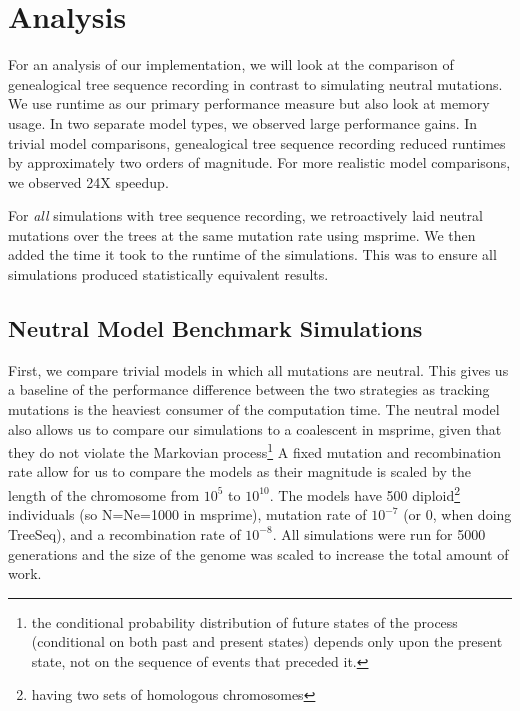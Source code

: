 \documentclass{article}
\begin{document}
\section{Analysis}

For an analysis of our implementation, we will look at the comparison of genealogical tree sequence recording in contrast to simulating neutral mutations. 
We use runtime as our primary performance measure but also look at memory usage.
In two separate model types, we observed large performance gains. 
In trivial model comparisons, genealogical tree sequence recording reduced runtimes by approximately two orders of magnitude. 
For more realistic model comparisons, we observed 24X speedup.

For \textit{all} simulations with tree sequence recording, we retroactively laid neutral mutations over the trees at the same mutation rate using msprime. 
We then added the time it took to the runtime of the simulations.
This was to ensure all simulations produced statistically equivalent results.


\subsection{Neutral Model Benchmark Simulations}

First, we compare trivial models in which all mutations are neutral.
This gives us a baseline of the performance difference between the two strategies
as tracking mutations is the heaviest consumer of the computation time.
The neutral model also allows us to compare our simulations to a coalescent in msprime,
given that they do not violate the 
Markovian process\footnote{the conditional probability distribution of future states of the process 
(conditional on both past and present states) depends only upon the present state, 
not on the sequence of events that preceded it.}
A fixed mutation and recombination rate allow for us to compare the models as their magnitude is 
scaled by the length of the chromosome from $10^{5}$ to $10^{10}$. 
The models have 500 diploid\footnote{having two sets of homologous chromosomes} 
individuals (so N=Ne=1000 in msprime), 
mutation rate of $10^{-7}$ (or 0, when doing TreeSeq), and a recombination rate of $10^{-8}$.  
All simulations were run for 5000 generations and 
the size of the genome was scaled to increase the total amount of work.

\end{document}
